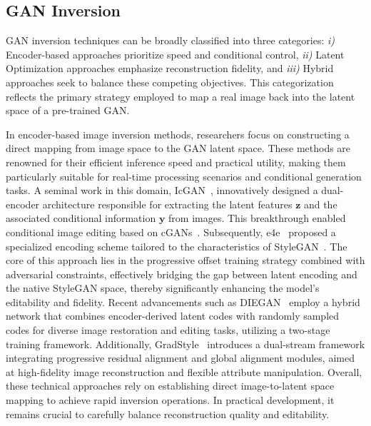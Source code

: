 \subsection{GAN Inversion}
GAN inversion techniques can be broadly classified into three categories: 
\textit{i)} Encoder-based approaches prioritize speed and conditional control, \textit{ii)} Latent Optimization approaches emphasize reconstruction fidelity, and \textit{iii)} Hybrid approaches seek to balance these competing objectives. This categorization reflects the primary strategy employed to map a real image back into the latent space of a pre-trained GAN.

In encoder-based image inversion methods, researchers focus on constructing a direct mapping from image space to the GAN latent space. These methods are renowned for their efficient inference speed and practical utility, making them particularly suitable for real-time processing scenarios and conditional generation tasks. A seminal work in this domain, IcGAN~\cite{IcGAN}, innovatively designed a dual-encoder architecture responsible for extracting the latent features $\mathbf{z}$ and the associated conditional information $\mathbf{y}$ from images. This breakthrough enabled conditional image editing based on cGANs~\cite{cGANs}. Subsequently, e4e~\cite{e4e} proposed a specialized encoding scheme tailored to the characteristics of StyleGAN~\cite{StyleGAN}. The core of this approach lies in the progressive offset training strategy combined with adversarial constraints, effectively bridging the gap between latent encoding and the native StyleGAN space, thereby significantly enhancing the model's editability and fidelity. Recent advancements such as DIEGAN~\cite{DIEGAN} employ a hybrid network that combines encoder-derived latent codes with randomly sampled codes for diverse image restoration and editing tasks, utilizing a two-stage training framework. Additionally, GradStyle~\cite{GradStyle} introduces a dual-stream framework integrating progressive residual alignment and global alignment modules, aimed at high-fidelity image reconstruction and flexible attribute manipulation. Overall, these technical approaches rely on establishing direct image-to-latent space mapping to achieve rapid inversion operations. In practical development, it remains crucial to carefully balance reconstruction quality and editability.


